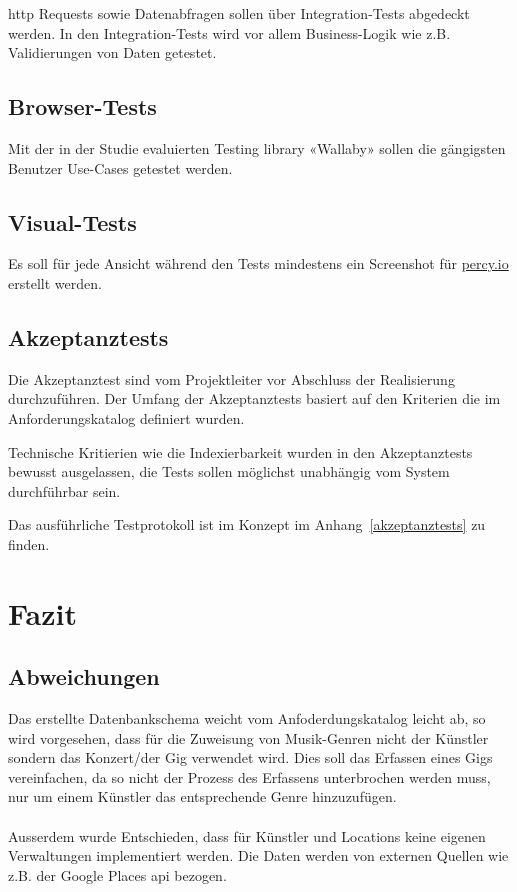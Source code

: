 \Gls{http} Requests sowie Datenabfragen sollen über Integration-Tests abgedeckt
werden. In den Integration-Tests wird vor allem Business-Logik wie z.B.
Validierungen von Daten getestet.

\subsection{Browser-Tests}

Mit der in der Studie evaluierten Testing \Gls{library} «Wallaby» sollen die
gängigsten Benutzer Use-Cases getestet werden.

\subsection{Visual-Tests}

Es soll für jede Ansicht während den Tests mindestens ein Screenshot für
\href{https://percy.io/}{percy.io} erstellt werden.

\subsection{Akzeptanztests}

Die Akzeptanztest sind vom Projektleiter vor Abschluss der Realisierung
durchzuführen. Der Umfang der Akzeptanztests basiert auf den Kriterien die im
Anforderungskatalog definiert wurden.

Technische Kritierien wie die Indexierbarkeit wurden in den Akzeptanztests
bewusst ausgelassen, die Tests sollen möglichst unabhängig vom System
durchführbar sein.

Das ausführliche Testprotokoll ist im Konzept im Anhang~\ref{akzeptanztests} zu finden.

\clearpage
\section{Fazit}

\subsection{Abweichungen}

Das erstellte Datenbankschema weicht vom Anfoderdungskatalog leicht ab,
so wird vorgesehen, dass für die Zuweisung von Musik-Genren nicht der Künstler
sondern das Konzert/der Gig verwendet wird.
Dies soll das Erfassen eines Gigs vereinfachen, da so nicht der Prozess des
Erfassens unterbrochen werden muss, nur um einem Künstler das entsprechende
Genre hinzuzufügen.\\
\\
Ausserdem wurde Entschieden, dass für Künstler und Locations keine eigenen
Verwaltungen implementiert werden. Die Daten werden von externen Quellen
wie z.B. der Google Places \acrshort{api} bezogen.

